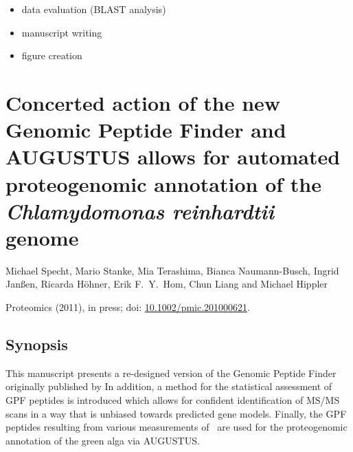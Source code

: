 \begin{itemize}
\item data evaluation (BLAST analysis)
\item manuscript writing
\item figure creation
\end{itemize}

{}

\cleardoublepage
\section{Concerted action of the new Genomic Peptide Finder and AUGUSTUS allows for automated proteogenomic annotation of the {\em Chlamydomonas reinhardtii} genome}

Michael Specht, Mario Stanke, Mia Terashima, Bianca Naumann-Busch, Ingrid Janßen, Ricarda H\"ohner, Erik F.~Y.~Hom, Chun Liang and Michael Hippler

Proteomics (2011), in press; doi: \href{http://dx.doi.org/10.1002/pmic.201000621}{10.1002/pmic.201000621}.

\label{paper:gpf}

\subsection*{Synopsis}

This manuscript presents a re-designed version of the Genomic Peptide Finder
originally published by \citeauthor{Allmer2004} 
In addition, a method for the statistical assessment of GPF peptides is
introduced which allows for confident identification of MS/MS scans in a
way that is unbiased towards predicted gene models.
Finally, the GPF peptides resulting from various measurements of \cre~are used 
for the proteogenomic annotation of the green alga via AUGUSTUS.

